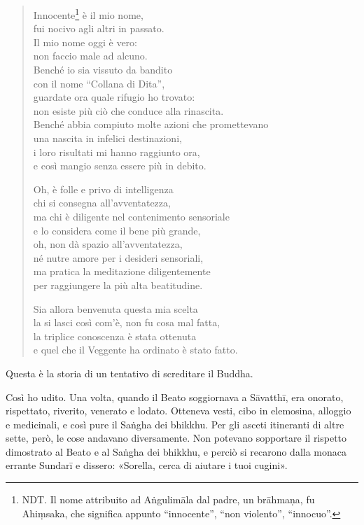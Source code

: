 \begin{quote}
Innocente\footnote{NDT. Il nome attribuito ad Aṅgulimāla dal padre, un brāhmaṇa, fu Ahiṃsaka, che significa appunto “innocente”, “non violento”, “innocuo”.} è il mio nome, \\
fui nocivo agli altri in passato. \\
Il mio nome oggi è vero: \\
non faccio male ad alcuno. \\
Benché io sia vissuto da bandito \\
con il nome “Collana di Dita”, \\
guardate ora quale rifugio ho trovato: \\
non esiste più ciò che conduce alla rinascita. \\
Benché abbia compiuto molte azioni che promettevano \\
una nascita in infelici destinazioni, \\
i loro risultati mi hanno raggiunto ora, \\
e così mangio senza essere più in debito.

Oh, è folle e privo di intelligenza \\
chi si consegna all’avventatezza, \\
ma chi è diligente nel contenimento sensoriale \\
e lo considera come il bene più grande, \\
oh, non dà spazio all’avventatezza, \\
né nutre amore per i desideri sensoriali, \\
ma pratica la meditazione diligentemente \\
per raggiungere la più alta beatitudine.

Sia allora benvenuta questa mia scelta \\
la si lasci così com’è, non fu cosa mal fatta, \\
la triplice conoscenza è stata ottenuta \\
e quel che il Veggente ha ordinato è stato fatto.
\end{quote}


 Questa è la storia di un tentativo di screditare
il Buddha.

 Così ho udito. Una volta, quando il Beato soggiornava a
Sāvatthī, era onorato, rispettato, riverito, venerato e lodato. Otteneva vesti,
cibo in elemosina, alloggio e medicinali, e così pure il Saṅgha dei bhikkhu. Per
gli asceti itineranti di altre sette, però, le cose andavano diversamente. Non
potevano sopportare il rispetto dimostrato al Beato e al Saṅgha dei bhikkhu, e
perciò si recarono dalla monaca errante Sundarī e dissero: «Sorella, cerca di
aiutare i tuoi cugini».

